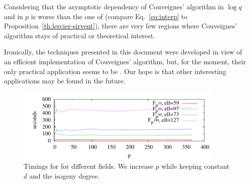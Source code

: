 Considering that the asymptotic dependency of Couveignes' algorithm in
$\log q$ and in $p$ is worse than the one of 
(compare Eq.~\eqref{eq:interp} to
Proposition~\ref{th:lercier-sirvent}), there are very few regions
where Couveignes' algorithm stays of practical or theoretical
interest.

  Ironically, the
techniques presented in this document were developed in view of an
efficient implementation of Couveignes' algorithm, but, for the
moment, their only practical application seems to be \ctwoud{}. Our hope
is that other interesting applications may be found in the future.

\begin{figure}
  \centering
  \includegraphics[width=0.9\textwidth]{isogeny/LSp}
  \caption{Timings for  for different fields. We
    increase $p$ while keeping constant $d$ and the isogeny degree.}
  \label{fig:LSp}
\end{figure}


%
